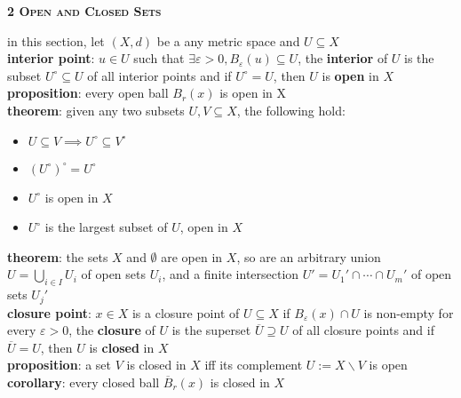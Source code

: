 \documentclass[a4paper]{article}
\newcommand*\closure[1]{\overline{#1}}
\newcommand*\interior[1]{{#1}^\circ}
\begin{document}
\begin{framed}
	\begin{center}
		\textbf{\textsc{2 Open and Closed Sets}}
	\end{center}
	in this section, let $(X, d)$ be a any metric space and $U \subseteq X$\\
	
	\noindent
	\textbf{interior point}: $u \in U$ such that $\exists \varepsilon > 0, B_\varepsilon(u) \subseteq U$, the \textbf{interior} of $U$ is the subset $\interior{U} \subseteq U$ of all interior points and if $\interior{U} = U$, then $U$ is \textbf{open} in $X$\\
	
	\noindent
	\textbf{proposition}: every open ball $B_r(x)$ is open in X\\
	
	\noindent
	\textbf{theorem}: given any two subsets $U, V \subseteq X$, the following hold:
	\begin{multicols}{2}
		\begin{itemize}
			\item $U \subseteq V \implies \interior{U} \subseteq \interior{V}$
			\item $\interior{(\interior{U})} = \interior{U}$
			\item $\interior{U}$ is open in $X$
			\item $\interior{U}$ is the largest subset of $U$, open in $X$
		\end{itemize}	
	\end{multicols}
	
	\noindent
	\textbf{theorem}: the sets $X$ and $\emptyset$ are open in $X$, so are an arbitrary union $U = \bigcup_{i \in I} U_i$ of open sets $U_i$, and a finite intersection $U' = U_1' \cap \cdots \cap U_m'$ of open sets $U_j'$\\
	
	\noindent
	\textbf{closure point}: $x \in X$ is a closure point of $U \subseteq X$ if $B_\varepsilon(x) \cap U$ is non-empty for every $\varepsilon > 0$, the \textbf{closure} of $U$ is the superset $\closure{U} \supseteq U$ of all closure points and if $\closure{U} = U$, then $U$ is \textbf{closed} in $X$\\
	
	\noindent
	\textbf{proposition}: a set $V$ is closed in $X$ iff its complement $U := X \backslash V$ is open\\
	
	\noindent
	\textbf{corollary}: every closed ball $\closure{B}_r(x)$ is closed in $X$\\
	

\end{framed}
\end{document}
